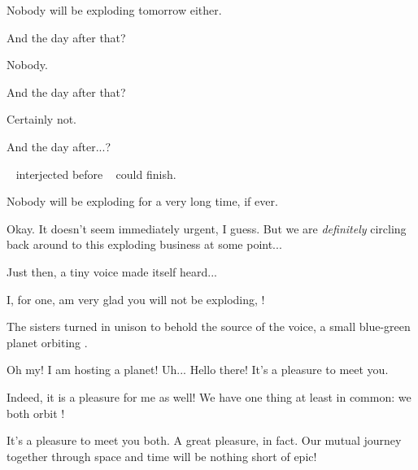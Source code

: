 \documentclass[main.tex]{subfiles}
\begin{document}
\par \Maia Nobody will be exploding tomorrow either.

\par \Merope And the day after that?

\par \Maia Nobody.

\par \Merope And the day after that?

\par \Maia Certainly not.

\par \Merope And the day after...?

\par \nar \rmmaia~ interjected before \rmmerope~ could finish.

\par \Maia Nobody will be exploding for a very long time, if ever.

\par \Merope Okay.  It doesn't seem immediately urgent, I guess. But we are \textit{definitely} circling back around to this exploding business at some point...

\par \nar Just then, a tiny voice made itself heard...

\par \Deltab I, for one, am very glad you will not be exploding, \rmmerope!

\par \nar The sisters turned in unison to behold the source of the voice, a small blue-green planet orbiting \rmmerope.

\par \Merope Oh my!  I am hosting a planet!  Uh... Hello there!  It's a pleasure to meet you.

\par \Maia Indeed, it is a pleasure for me as well!  We have one thing at least in common:  we both orbit \rmmerope!

\par \Deltab It's a pleasure to meet you both.  A great pleasure, in fact. Our mutual journey together through space and time will be nothing short of epic!
\end{document}
